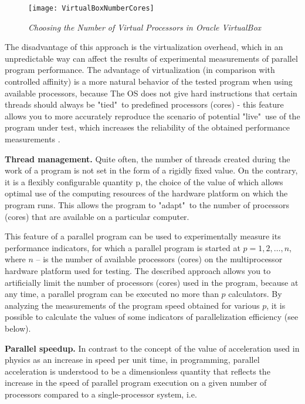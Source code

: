 {	\begin{figure}[H]
		\texttt{[image: VirtualBoxNumberCores]}
		\caption{\textit{Choosing the Number of Virtual Processors in Oracle VirtualBox}}
		\label{VirtualBoxNumberCores:image}
	\end{figure}
	\par The disadvantage of this approach is the virtualization overhead, which in an unpredictable way can affect the results of experimental measurements of parallel program performance. The advantage of virtualization (in comparison with controlled affinity) is a more natural behavior of the tested program when using available processors, because The OS does not give hard instructions that certain threads should always be "tied"\ to predefined processors (cores) - this feature allows you to more accurately reproduce the scenario of potential "live"\ use of the program under test, which increases the reliability of the obtained performance measurements .
	\par\textbf{Thread management.} Quite often, the number of threads created during the work of a program is not set in the form of a rigidly fixed value. On the contrary, it is a flexibly configurable quantity p, the choice of the value of which allows optimal use of the computing resources of the hardware platform on which the program runs. This allows the program to "adapt"\ to the number of processors (cores) that are available on a particular computer.
	\par This feature of a parallel program can be used to experimentally measure its performance indicators, for which a parallel program is started at $p = 1,2,…,n$, where $n$ –  is the number of available processors (cores) on the multiprocessor hardware platform used for testing. The described approach allows you to artificially limit the number of processors (cores) used in the program, because at any time, a parallel program can be executed no more than $p$ calculators. By analyzing the measurements of the program speed obtained for various $p$, it is possible to calculate the values of some indicators of parallelization efficiency (see below).
	\par\textbf{Parallel speedup.} In contrast to the concept of the value of acceleration used in physics as an increase in speed per unit time, in programming, parallel acceleration is understood to be a dimensionless quantity that reflects the increase in the speed of parallel program execution on a given number of processors compared to a single-processor system, i.e.
}
